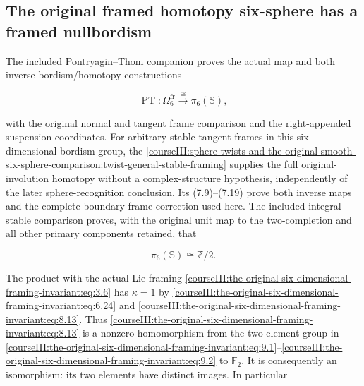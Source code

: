 \subsection{The original framed homotopy six-sphere has a framed nullbordism}
\label{courseIII:the-original-six-dimensional-framing-invariant:framed-six-original-nullbordism}

\label{courseIII:the-original-six-dimensional-framing-invariant:section-9}\label{courseIII:framed6:9}

The included Pontryagin--Thom companion proves the actual map and both inverse bordism/homotopy constructions

\begin{equation}
\operatorname{PT}:\Omega^{\mathrm{fr}}_6
                                       \xrightarrow{\ \cong\ }\pi_6(\mathbb S),
 \label{courseIII:the-original-six-dimensional-framing-invariant:eq:9.1}
\end{equation}

with the original normal and tangent frame comparison and the right-appended suspension coordinates. For arbitrary stable tangent frames in this six-dimensional bordism group, the \cref{courseIII:sphere-twists-and-the-original-smooth-six-sphere-comparison:twist-general-stable-framing} supplies the full original-involution homotopy without a complex-structure hypothesis, independently of the later sphere-recognition conclusion. Its (7.9)--(7.19) prove both inverse maps and the complete boundary-frame correction used here. The included integral stable comparison proves, with the original unit map to the two-completion and all other primary components retained, that

\begin{equation}
\pi_6(\mathbb S)\cong\mathbb Z/2.
 \label{courseIII:the-original-six-dimensional-framing-invariant:eq:9.2}
\end{equation}

The product with the actual Lie framing \eqref{courseIII:the-original-six-dimensional-framing-invariant:eq:3.6} has \(\kappa=1\) by \eqref{courseIII:the-original-six-dimensional-framing-invariant:eq:6.24} and \eqref{courseIII:the-original-six-dimensional-framing-invariant:eq:8.13}. Thus \eqref{courseIII:the-original-six-dimensional-framing-invariant:eq:8.13} is a nonzero homomorphism from the two-element group in \eqref{courseIII:the-original-six-dimensional-framing-invariant:eq:9.1}--\eqref{courseIII:the-original-six-dimensional-framing-invariant:eq:9.2} to \(\mathbb F_2\). It is consequently an isomorphism: its two elements have distinct images. In particular

